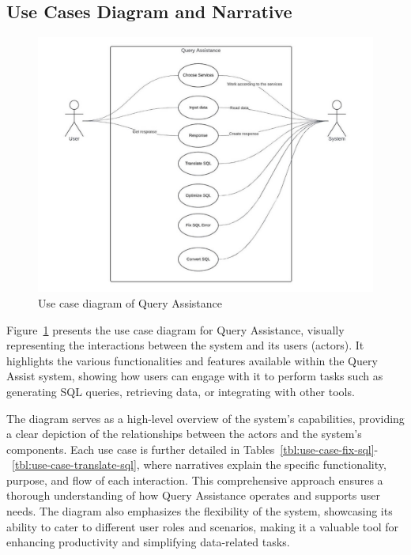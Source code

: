     \subsection{Use Cases Diagram and Narrative}
    \begin{figure}[H]
        \centering
        \includegraphics[width=15cm]{chapters/3/figures/usecase_diagram.jpg}
        \caption[Use case diagram of Query Assistance]{Use case diagram of Query Assistance}
        \label{fig:usecase_diagram}
    \end{figure}
    Figure~\ref{fig:usecase_diagram} presents the use case diagram for Query Assistance, visually representing the interactions between the system and its users (actors). It highlights the various functionalities and features available within the Query Assist system, showing how users can engage with it to perform tasks such as generating SQL queries, retrieving data, or integrating with other tools. 

    The diagram serves as a high-level overview of the system's capabilities, providing a clear depiction of the relationships between the actors and the system's components. Each use case is further detailed in Tables~\ref{tbl:use-case-fix-sql}-~\ref{tbl:use-case-translate-sql}, where narratives explain the specific functionality, purpose, and flow of each interaction. This comprehensive approach ensures a thorough understanding of how Query Assistance operates and supports user needs. The diagram also emphasizes the flexibility of the system, showcasing its ability to cater to different user roles and scenarios, making it a valuable tool for enhancing productivity and simplifying data-related tasks.
    
